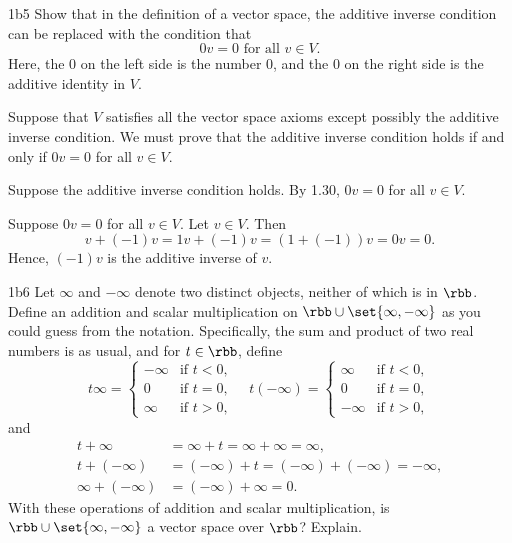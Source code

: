 \begin{exercise}{1b5}
    Show that in the definition of a vector space, the additive inverse condition can be replaced with the condition that
    \[
    	0v = 0 \text{ for all } v \in V.
    \]
    Here, the $0$ on the left side is the number $0$, and the $0$ on the right side is the additive identity in $V$.

\end{exercise}

\begin{sol}
    Suppose that $V$ satisfies all the vector space axioms except possibly the additive inverse condition.
    We must prove that the additive inverse condition holds if and only if $0v = 0$ for all $v \in V$.

    \rightimp Suppose the additive inverse condition holds.
    By 1.30, $0v = 0$ for all $v \in V$.

    \leftimp Suppose $0v = 0$ for all $v \in V$.
    Let $v \in V$.
    Then
    \[
        v + (-1)v = 1v + (-1)v = (1 + (-1))v = 0v = 0.
    \]
    Hence, $(-1)v$ is the additive inverse of $v$.
\end{sol}

\begin{exercise}{1b6}
    Let $\infty$ and $-\infty$ denote two distinct objects, neither of which is in $\rbb$.
	Define an addition and scalar multiplication on $\rbb \cup \set{\infty, -\infty}$ as you could guess from the notation.
	Specifically, the sum and product of two real numbers is as usual, and for $t \in \rbb$, define
    \[
        t\infty = 
        \begin{cases}
            -\infty & \text{if } t < 0, \\
            0 & \text{if } t = 0, \\
            \infty & \text{if } t > 0,
        \end{cases} \quad
        t(-\infty) = 
        \begin{cases}
            \infty & \text{if } t < 0, \\
            0 & \text{if } t = 0, \\
            -\infty & \text{if } t > 0,
        \end{cases}
    \]
    and
    \begin{align*}
        t + \infty & = \infty + t = \infty + \infty = \infty, \\
        t + (-\infty) & = (-\infty) + t = (-\infty) + (-\infty) = -\infty, \\
        \infty + (-\infty) & = (-\infty) + \infty = 0.
    \end{align*}
    With these operations of addition and scalar multiplication, is $\rbb \cup \set{\infty, -\infty}$ a vector space over $\rbb$?
	Explain.
\end{exercise}

